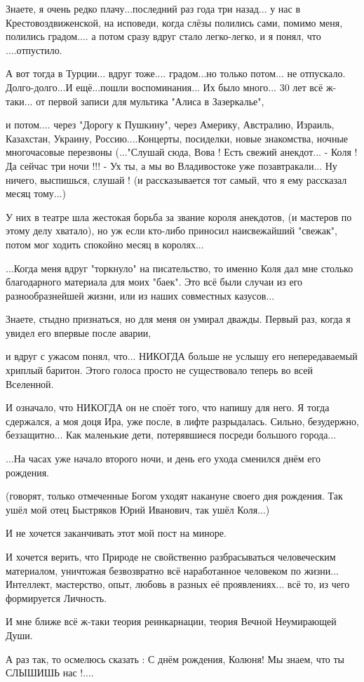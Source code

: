 Знаете, я очень редко плачу...последний раз года три назад... у нас в
Крестовоздвиженской, на исповеди, когда слёзы полились сами, помимо меня,
полились градом.... а потом сразу вдруг стало легко-легко, и я понял, что
....отпустило. 

А вот тогда в Турции... вдруг тоже.... градом...но только потом... не
отпускало. Долго-долго...И ещё...пошли воспоминания... Их было много... 30 лет
всё ж-таки... от первой записи для мультика "Алиса в Зазеркалье", 

и потом.... через "Дорогу к Пушкину", через Америку, Австралию, Израиль,
Казахстан, Украину, Россию....Концерты, посиделки, новые знакомства, ночные
многочасовые перезвоны (..."Слушай сюда, Вова ! Есть свежий анекдот... - Коля !
Да сейчас три ночи !!! - Ух ты, а мы во Владивостоке уже позавтракали... Ну
ничего, выспишься, слушай ! (и рассказывается тот самый, что я ему рассказал
месяц тому...) 

У них в театре шла жестокая борьба за звание короля анекдотов, (и мастеров по
этому делу хватало), но уж если кто-либо приносил наисвежайший "свежак", потом
мог ходить спокойно месяц в королях...

...Когда меня вдруг "торкнуло" на писательство, то именно Коля дал мне столько
благодарного материала для моих "баек". Это всё были случаи из его
разнообразнейшей жизни, или из наших совместных казусов... 

Знаете, стыдно признаться, но для меня он умирал дважды. Первый раз, когда я
увидел его впервые после аварии, 

и вдруг с ужасом понял, что... НИКОГДА больше не услышу его непередаваемый
хриплый баритон. Этого голоса просто не существовало теперь во всей Вселенной. 

И означало, что НИКОГДА он не споёт того, что напишу для него. Я тогда
сдержался, а моя доця Ира, уже после, в лифте разрыдалась. Сильно, безудержно,
беззащитно... Как маленькие дети, потерявшиеся посреди большого города...

...На часах уже начало второго ночи, и день его 
ухода сменился днём его рождения. 

(говорят, только отмеченные Богом уходят накануне своего дня рождения. Так ушёл
мой отец Быстряков Юрий Иванович, так ушёл Коля...) 

И не хочется заканчивать этот мой пост на миноре. 

И хочется верить, что Природе не свойственно разбрасываться человеческим
материалом, уничтожая безвозвратно всё наработанное человеком по жизни...
Интеллект, мастерство, опыт, любовь в разных её проявлениях... всё то, из чего
формируется Личность. 

И мне ближе всё ж-таки теория реинкарнации, теория Вечной Неумирающей Души. 

А раз так, то осмелюсь сказать : С днём рождения, Колюня! Мы знаем, что ты
СЛЫШИШЬ нас !....

